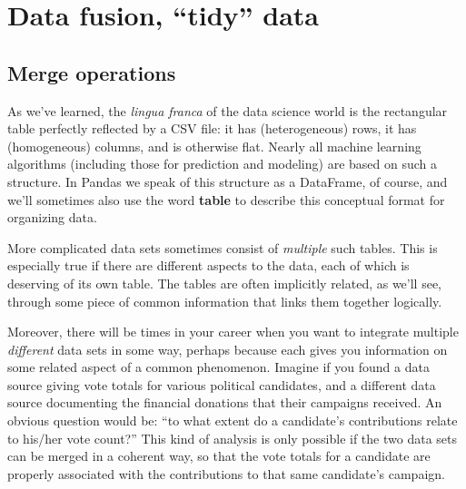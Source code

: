 
%
%
%
% 
%
%
%
%

\chapter{Data fusion, ``tidy'' data}

\section{Merge operations}

As we've learned, the \textit{lingua franca} of the data science world is the
rectangular table perfectly reflected by a CSV file: it has (heterogeneous)
rows, it has (homogeneous) columns, and is otherwise flat. Nearly all machine
learning algorithms (including those for prediction and modeling) are based on
such a structure. In Pandas we speak of this structure as a DataFrame, of
course, and we'll sometimes also use the word \textbf{table} to describe this
conceptual format for organizing data.

More complicated data sets sometimes consist of \textit{multiple} such tables.
This is especially true if there are different aspects to the data, each of
which is deserving of its own table. The tables are often implicitly related,
as we'll see, through some piece of common information that links them
together logically.

Moreover, there will be times in your career when you want to integrate
multiple \textit{different} data sets in some way, perhaps because each gives
you information on some related aspect of a common phenomenon. Imagine if you
found a data source giving vote totals for various political candidates, and a
different data source documenting the financial donations that their campaigns
received. An obvious question would be: ``to what extent do a candidate's
contributions relate to his/her vote count?'' This kind of analysis is only
possible if the two data sets can be merged in a coherent way, so that the
vote totals for a candidate are properly associated with the contributions to
that same candidate's campaign.


